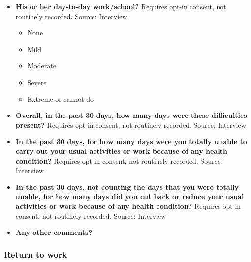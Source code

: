 \documentclass[
]{scrartcl}
\providecommand{\tightlist}{%
  \setlength{\itemsep}{0pt}\setlength{\parskip}{0pt}}\usepackage{longtable,booktabs,array}
\begin{document}
\begin{itemize}
  \begin{itemize}
  \tightlist
  \item
    None
  \item
    Mild
  \item
    Moderate
  \item
    Severe
  \item
    Extreme or cannot do
  \end{itemize}
\item
  \textbf{His or her day-to-day work/school?} Requires opt-in consent,
  not routinely recorded. Source: Interview

  \begin{itemize}
  \tightlist
  \item
    None
  \item
    Mild
  \item
    Moderate
  \item
    Severe
  \item
    Extreme or cannot do
  \end{itemize}
\item
  \textbf{Overall, in the past 30 days, how many days were these
  difficulties present?} Requires opt-in consent, not routinely
  recorded. Source: Interview
\item
  \textbf{In the past 30 days, for how many days were you totally unable
  to carry out your usual activities or work because of any health
  condition?} Requires opt-in consent, not routinely recorded. Source:
  Interview
\item
  \textbf{In the past 30 days, not counting the days that you were
  totally unable, for how many days did you cut back or reduce your
  usual activities or work because of any health condition?} Requires
  opt-in consent, not routinely recorded. Source: Interview
\item
  \textbf{Any other comments?}
\end{itemize}

\subsubsection{Return to work}\label{return-to-work}
\end{document}
